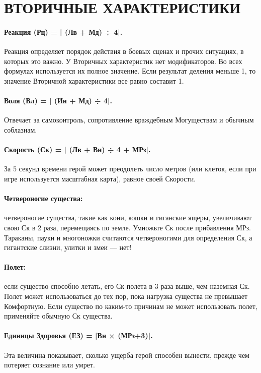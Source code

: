 %

\section{ВТОРИЧНЫЕ ХАРАКТЕРИСТИКИ}
\paragraph{Реакция (Рц) = | (Лв + Мд) ÷ 4|.} Реакция определяет порядок действия в боевых сценах и прочих ситуациях, в которых это важно. У Вторичных характеристик нет модификаторов. Во всех формулах используется их полное значение. Если результат деления меньше 1, то значение Вторичной характеристики все равно составит 1.
\paragraph{Воля (Вл) = | (Ин + Мд) ÷ 4|.} Отвечает за самоконтроль, сопротивление враждебным Могуществам и обычным соблазнам.
\paragraph{Скорость (Ск) = | (Лв + Вн) ÷ 4 + МРз|.} За 5 секунд времени герой может преодолеть число метров (или клеток, если при игре используется масштабная карта), равное своей Скорости.
\paragraph{Четвероногие существа:} четвероногие существа, такие как кони, кошки и гиганские ящеры, увеличивают свою Ск в 2 раза, перемещаясь по земле. Умножьте Ск после прибавления МРз. Тараканы, пауки и многоножки считаются четвероногими для определения Ск, а гигантские слизни, улитки и змеи — нет!
\paragraph{Полет:} если существо способно летать, его Ск полета в 3 раза выше, чем наземная Ск. Полет может использоваться до тех пор, пока нагрузка существа не превышает Комфортную. Если существо по каким-то причинам не может использовать полет, применяйте обычную Ск существа.
\paragraph{Единицы Здоровья (ЕЗ) = |Вн × (МРз+3)|.} Эта величина показывает, сколько ущерба герой способен вынести, прежде чем потеряет сознание или умрет.
